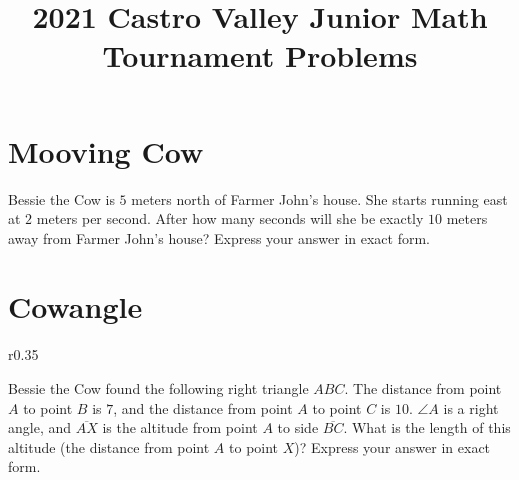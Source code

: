 \documentclass{article}
\title{2021 Castro Valley Junior Math Tournament Problems}
\author{}
\date{}
\begin{document}
\maketitle

\section*{Mooving Cow}
Bessie the Cow is $5$ meters north of Farmer John's house.
She starts running east at $2$ meters per second.
After how many seconds will she be exactly $10$ meters away from Farmer John's house?
Express your answer in exact form.

\section*{Cowangle}
\begin{wrapfigure}{r}{0.35\linewidth}
	\vspace{-20pt}
	\centering
	\vspace{-20pt}
\end{wrapfigure}
Bessie the Cow found the following right triangle $ABC$.
The distance from point $A$ to point $B$ is $7$, and the distance from point $A$ to point $C$ is $10$.
$\angle A$ is a right angle, and $\overline{AX}$ is the altitude from point $A$ to side $\overline{BC}$.
What is the length of this altitude (the distance from point $A$ to point $X$)?
Express your answer in exact form.
\end{document}
